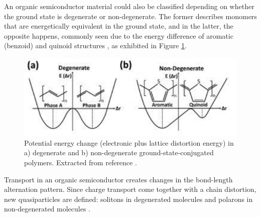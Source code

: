 

An organic semiconductor material could also be classified depending on whether the ground state is degenerate or non-degenerate. The former describes monomers that are energetically equivalent in the ground state, and in the latter, the opposite happens, commonly seen due to the energy difference of aromatic (benzoid) and quinoid structures \cite{heegerSolitonsConductingPolymers1988a}, as exhibited in Figure \ref{fig:energy}.

\begin{figure}[h]
  \centering
  \includegraphics[width=12cm]{Images/pdf/deg_pol.pdf}
  \caption[Degenerate and non-degenerate conjugated polymers]{Potential energy change (electronic plus lattice distortion energy) in a) degenerate and b) non-degenerate ground-state-conjugated polymers. Extracted from reference \cite{heydarigharahcheshmehTextureNanostructuralEngineering2020}.}
  \label{fig:energy}
\end{figure}

Transport in an organic semiconductor creates changes in the bond-length alternation pattern. Since charge transport come together with a chain distortion, new quasiparticles are defined: solitons in degenerated molecules and polarons in non-degenerated molecules \cite{bredasRoleMobileOrganic1984}.


